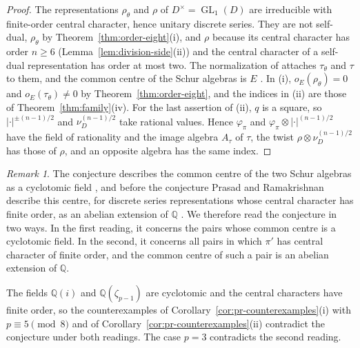 \documentclass[a4paper,11pt]{amsart}
\theoremstyle{definition}
\theoremstyle{remark}
\newtheorem{remark}[theorem]{Remark}
\numberwithin{equation}{section}
\newcommand{\Q}{\mathbb{Q}}
\DeclareMathOperator{\GL}{GL}
\begin{document}
\begin{proof}
The representations $\rho_\theta$ and $\rho$ of $D^\times=\GL_1(D)$ are irreducible with finite-order central character, hence unitary discrete series. They are not self-dual, $\rho_\theta$ by Theorem~\ref{thm:order-eight}(i), and $\rho$ because its central character has order $n\ge6$ (Lemma~\ref{lem:division-side}(ii)) and the central character of a self-dual representation has order at most two. The normalization of \cite[\S6]{PR12} attaches $\tau_\theta$ and $\tau$ to them, and the common centre of the Schur algebras is $E$ \cite[Lemma~3.0.7]{Su23}. In (i), $o_E(\rho_\theta)=0$ and $o_E(\tau_\theta)\ne0$ by Theorem~\ref{thm:order-eight}, and the indices in (ii) are those of Theorem~\ref{thm:family}(iv). For the last assertion of (ii), $q$ is a square, so $|\cdot|^{\pm(n-1)/2}$ and $\nu_D^{(n-1)/2}$ take rational values. Hence $\varphi_\pi$ and $\varphi_\pi\otimes|\cdot|^{(n-1)/2}$ have the field of rationality and the image algebra $A_\tau$ of $\tau$, the twist $\rho\otimes\nu_D^{(n-1)/2}$ has those of $\rho$, and an opposite algebra has the same index.
\end{proof}

\begin{remark}\label{rem:cyclotomic-centre}
The conjecture describes the common centre of the two Schur algebras as a cyclotomic field \cite[Conjecture~6.1]{PR12}, and before the conjecture Prasad and Ramakrishnan describe this centre, for discrete series representations whose central character has finite order, as an abelian extension of $\Q$ \cite[\S6]{PR12}. We therefore read the conjecture in two ways. In the first reading, it concerns the pairs whose common centre is a cyclotomic field. In the second, it concerns all pairs in which $\pi'$ has central character of finite order, and the common centre of such a pair is an abelian extension of $\Q$.

The fields $\Q(i)$ and $\Q(\zeta_{p-1})$ are cyclotomic and the central characters have finite order, so the counterexamples of Corollary~\ref{cor:pr-counterexamples}(i) with $p\equiv5\pmod8$ and of Corollary~\ref{cor:pr-counterexamples}(ii) contradict the conjecture under both readings. The case $p=3$ contradicts the second reading.
\end{remark}
\end{document}
